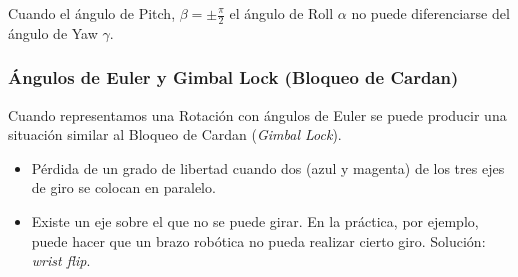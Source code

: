 \begin{frame}
    Cuando el ángulo de Pitch, $\beta = \pm \frac{\pi}{2}$ el ángulo de Roll $\alpha$ no puede diferenciarse del ángulo de Yaw $\gamma$.
    
\end{frame}


\begin{frame}
    \frametitle{Ángulos de Euler y Gimbal Lock (Bloqueo de Cardan)}
    \scriptsize

    Cuando representamos una Rotación con ángulos de Euler se puede producir una situación similar al Bloqueo de Cardan (\emph{Gimbal Lock}).    
    
    \begin{center}
        \hspace{1em}
    \end{center}
    
    
    \begin{itemize}
        \item Pérdida de un grado de libertad cuando dos (azul y magenta) de los tres ejes de giro se colocan en paralelo.
        \item Existe un eje sobre el que no se puede girar. En la práctica, por ejemplo, puede hacer que un brazo robótica no pueda realizar cierto giro. Solución: \emph{wrist flip}.
    \end{itemize}
    

\end{frame}
